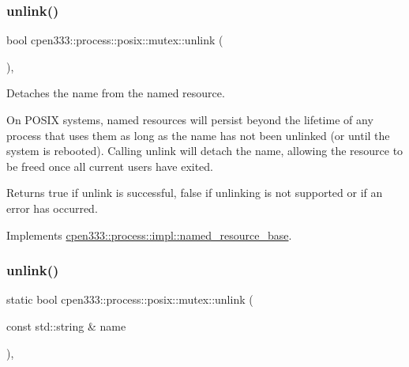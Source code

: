 \subsubsection{\texorpdfstring{unlink()}{unlink()}\hspace{0.1cm}{\footnotesize\ttfamily [1/2]}}
{\footnotesize\ttfamily bool cpen333\+::process\+::posix\+::mutex\+::unlink (\begin{DoxyParamCaption}{ }\end{DoxyParamCaption})\hspace{0.3cm}{\ttfamily [inline]}, {\ttfamily [virtual]}}



Detaches the name from the named resource. 

On P\+O\+S\+IX systems, named resources will persist beyond the lifetime of any process that uses them as long as the name has not been unlinked (or until the system is rebooted). Calling {\ttfamily unlink} will detach the name, allowing the resource to be freed once all current users have exited.

\begin{DoxyReturn}{Returns}
{\ttfamily true} if unlink is successful, {\ttfamily false} if unlinking is not supported or if an error has occurred. 
\end{DoxyReturn}


Implements \hyperlink{classcpen333_1_1process_1_1impl_1_1named__resource__base_ae4033f82dfd068b917a9bca57d3a0c45}{cpen333\+::process\+::impl\+::named\+\_\+resource\+\_\+base}.

\mbox{\label{classcpen333_1_1process_1_1posix_1_1mutex_ae5750c148e0408daac498a87d2d9a579}} 
\subsubsection{\texorpdfstring{unlink()}{unlink()}\hspace{0.1cm}{\footnotesize\ttfamily [2/2]}}
{\footnotesize\ttfamily static bool cpen333\+::process\+::posix\+::mutex\+::unlink (\begin{DoxyParamCaption}\item[{const std\+::string \&}]{name }\end{DoxyParamCaption})\hspace{0.3cm}{\ttfamily [inline]}, {\ttfamily [static]}}




